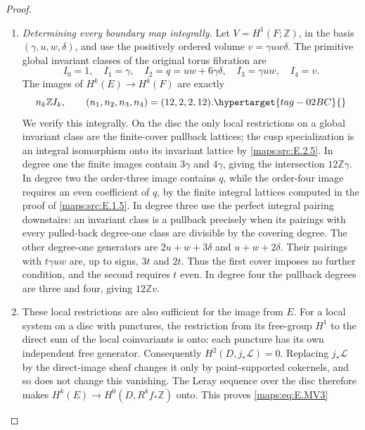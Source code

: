 \documentclass[11pt,a4paper]{article}
\numberwithin{equation}{section}
\theoremstyle{definition}
\begin{document}
\begin{proof}
\begin{enumerate}[label=\arabic*.,leftmargin=*]
\item \emph{Determining every boundary map integrally.}
Let $V=H^1(F;\mathbb Z)$, in the basis $(\gamma,u,w,\delta)$,
and use the positively ordered volume
$v=\gamma u w\delta$. The primitive global invariant classes
of the original torus fibration are
\[
 I_0=1,\quad I_1=\gamma,\quad
 I_2=q=uw+6\gamma\delta,\quad
 I_3=\gamma uw,\quad I_4=v.
\]
The images of $H^k(E)\to H^k(F)$ are exactly
\begin{equation}
 n_k\mathbb Z I_k,\qquad
 (n_1,n_2,n_3,n_4)=(12,2,2,12).
 \hypertarget{tag-02BC}{}\label{maps:eq:E.MV3}
\end{equation}
We verify this integrally. On the disc the only local restrictions on a global
invariant class are the finite-cover pullback lattices;
the cusp specialization is an integral isomorphism onto its
invariant lattice by \ref{maps:src:E.2.5}. In degree one the finite images
contain $3\gamma$ and $4\gamma$, giving the intersection
$12\mathbb Z\gamma$. In degree two the order-three image
contains $q$, while the order-four image requires an even
coefficient of $q$, by the finite integral lattices computed in the proof of \cref{maps:src:E.1.5}.
In degree three use the perfect integral pairing downstairs:
an invariant class is a pullback precisely when its pairings
with every pulled-back degree-one class are divisible by the
covering degree. The other degree-one generators are
$2u+w+3\delta$ and $u+w+2\delta$. Their pairings with
$t\gamma uw$ are, up to signs, $3t$ and $2t$.
Thus the first cover imposes no further condition, and the
second requires $t$ even. In degree four the pullback degrees
are three and four, giving $12\mathbb Z v$.

\item These local restrictions are also sufficient for the image
from $E$. For a local system on a disc with punctures, the
restriction from its free-group $H^1$ to the direct sum of
the local coinvariants is onto: each puncture has its own
independent free generator. Consequently
$H^2(D,j_*\mathcal L)=0$. Replacing $j_*\mathcal L$ by the
direct-image sheaf changes it only by point-supported
cokernels, and so does not change this vanishing.
The Leray sequence over the disc therefore makes
$H^k(E)\to H^0(D,R^kf_*\mathbb Z)$ onto. This proves
\eqref{maps:eq:E.MV3} 


\end{enumerate}
\end{proof}
\end{document}
